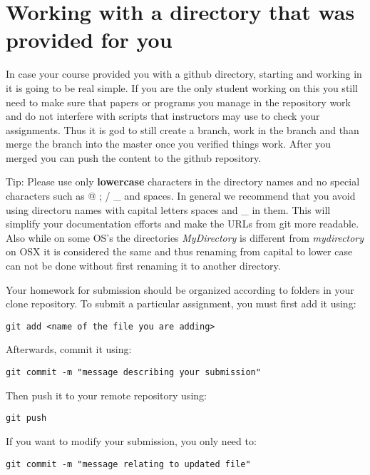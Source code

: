 \section{Working with a directory that was provided for you}

In case your course provided you with a github directory, starting and
working in it is going to be real simple. If you are the only student
working on this you still need to make sure that papers or programs
you manage in the repository work and do not interfere with scripts
that instructors may use to check your assignments. Thus it is god to
still create a branch, work in the branch and than merge the branch
into the master once you verified things work. After you merged you
can push the content to the github repository.

Tip: Please use only \textbf{lowercase} characters in the directory
names and no special characters such as @ ; / \_ and spaces. In general
we recommend that you avoid using directoru names with capital letters
spaces and \_ in them. This will simplify your documentation efforts and
make the URLs from git more readable. Also while on some OS's the
directories {\em MyDirectory} is different from {\em mydirectory} on OSX
it is considered the same and thus renaming from capital to lower case
can not be done without first renaming it to another directory. 


Your homework for submission should be organized according to folders in
your clone repository. To submit a particular assignment, you must first
add it using:

\begin{verbatim}
git add <name of the file you are adding>
\end{verbatim}

Afterwards, commit it using:

\begin{verbatim}
git commit -m "message describing your submission"
\end{verbatim}

Then push it to your remote repository using:

\begin{verbatim}
git push
\end{verbatim}

If you want to modify your submission, you only need to:

\begin{verbatim}
git commit -m "message relating to updated file"
\end{verbatim}

